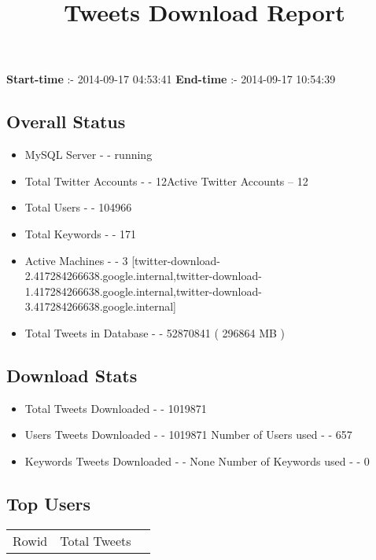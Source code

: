 \documentclass{article}\usepackage[T1]{fontenc}
\begin{document}
\title{\textbf{Tweets Download Report}}
               \date{}
                \maketitle
               \centerline{\textbf{Start-time} :- 2014-09-17 04:53:41 \hspace{40pt} \textbf{End-time} :- 2014-09-17 10:54:39}               \subsection*{Overall Status}                \begin{itemize}                \item MySQL Server - - running               \item Total Twitter Accounts - - 12\newline Active Twitter Accounts -- 12               \item Total Users - - 104966               \item Total Keywords - - 171               \item Active Machines - - 3 [twitter-download-2.417284266638.google.internal,twitter-download-1.417284266638.google.internal,twitter-download-3.417284266638.google.internal]               \item Total Tweets in Database - - 52870841 ( 296864 MB )               \end{itemize}               \subsection*{Download Stats}                \begin{itemize}                \item Total Tweets Downloaded - - 1019871               \item Users Tweets Downloaded - - 1019871 \newline Number of Users used - - 657               \item Keywords Tweets Downloaded - - None \newline Number of Keywords used - - 0              \end{itemize}              \subsection*{Top Users}\begin{tabular}{|c|c|c|}         \hline         Rowid & Total Tweets \\ 

\end{tabular}
\end{document}
